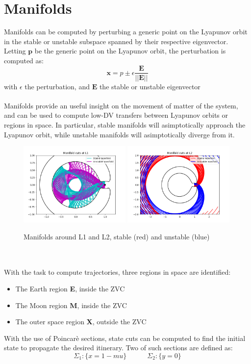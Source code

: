 \documentclass{report}
\begin{document}
\section*{Manifolds}
Manifolds can be computed by perturbing a generic point on the Lyapunov orbit in the stable or unstable subspace
spanned by their respective eigenvector. Letting $\boldsymbol{p}$ be the generic point on the Lyapunov orbit, the perturbation is computed as:
\begin{equation}
    \boldsymbol{x} = p \pm \epsilon \frac{\boldsymbol{E}}{||\boldsymbol{E}||}
\end{equation}
with $\epsilon$ the perturbation, and $\boldsymbol{E}$ the stable or unstable eigenvector\\\\
Manifolds provide an useful insight on the movement of matter of the system, and can be used to compute low-DV transfers between Lyapunov orbits or regions in space.
In particular, stable manifolds will asimptotically approach the Lyapunov orbit, while unstable manifolds will asimptotically diverge from it.
\begin{figure}[h]
    \centering
    \includegraphics[width=0.49\textwidth]{images/manifold_L1.png}
    \includegraphics[width=0.49\textwidth]{images/manifold_L2.png}
    \caption{Manifolds around L1 and L2, stable (red) and unstable (blue)}
\end{figure}
\\\\
With the task to compute trajectories, three regions in space are identified:
\begin{itemize}
    \item The Earth region \textbf{E}, inside the ZVC
    \item The Moon region \textbf{M}, inside the ZVC
    \item The outer space region \textbf{X}, outside the ZVC
\end{itemize}
With the use of Poincarè sections, state cuts can be computed to find the initial state to propagate the desired itinerary.
Two of such sections are defined as:
\begin{equation}
    \Sigma_1 : \{x = 1-mu\} \quad \quad \quad \Sigma_2 : \{y = 0\}
\end{equation}
\newpage
\end{document}

